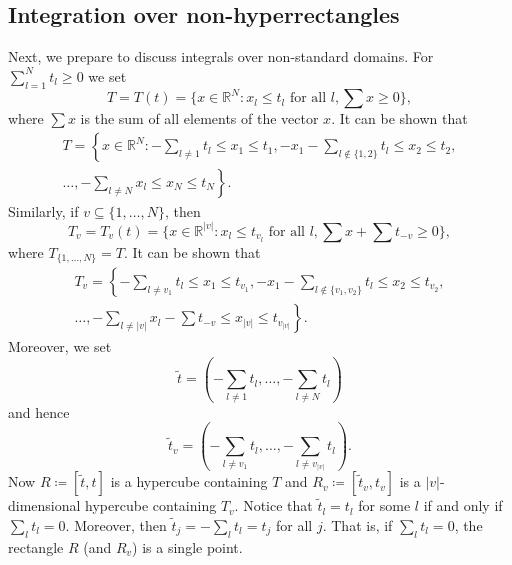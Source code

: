 \documentclass[english, a4paper, 12pt,reqno]{amsart}
\begin{document}
\subsection{Integration over non-hyperrectangles}
\label{subsec:RS-triangle}
Next, we prepare to discuss integrals over non-standard domains. For $\sum_{l=1}^N t_l \geq 0$ we set 
\begin{equation}
\label{T}
T = T(t) = \{x\in\mathbb{R}^N : x_l \leq t_l\text{ for all } l, \sum x \geq 0\},
\end{equation}
where $\sum x$ is the sum of all elements of the vector $x$.
It can be shown that
\begin{equation*}
\begin{split}
T = \left\{x\in\mathbb{R}^N : -\sum_{l\neq 1}t_l \leq x_1 \leq t_1, -x_1-\sum_{l \notin \{1,2\}} t_l \leq x_2 \leq t_2,\right.\\
\left.\dots, -\sum_{l\neq N}x_l \leq x_N \leq t_N \right\}.
\end{split}
\end{equation*}
Similarly, if $v \subseteq \{1,\dots,N\}$, then
$$T_v = T_v(t)= \{ x\in\mathbb{R}^{|v|} : x_l \leq t_{v_l} \text{ for all } l, \sum x+ \sum t_{-v} \geq 0\},$$
where $T_{\{1,\dots,N\}} = T.$
It can be shown that
\begin{equation}
\label{T_v}
\begin{split}
T_v = \left\{-\sum_{l\neq v_1} t_l \leq x_1 \leq t_{v_1}, -x_1-\sum_{l \notin \{v_1,v_2\}} t_l \leq x_2 \leq t_{v_2},\right. \\
\left. \dots, -\sum_{l\neq |v|}x_l  - \sum t_{-v}\leq x_{|v|}\leq t_{v_{|v|}} \right\}.
\end{split}
\end{equation}
Moreover, we set
$$\tilde{t} = \left( -\sum_{l\neq 1} t_l, \dots, -\sum_{l \neq N}t_l\right)$$
and hence
$$\tilde{t}_v = \left( -\sum_{l\neq v_1} t_l, \dots, -\sum_{l \neq v_{|v|}}t_l\right).$$
Now $ R \coloneqq [\tilde{t},t]$ is a hypercube containing $T$ and $R_v \coloneqq [\tilde{t}_v,t_v]$ is a $|v|$-dimensional hypercube containing $T_v$. Notice that $\tilde{t}_l = t_l$ for some $l$ if and only if $\sum_l t_l = 0$. Moreover, then $\tilde{t}_j = -\sum_l t_l = t_j$ for all $j$. That is, if $\sum_l t_l = 0$, the rectangle $R$ (and $R_v$) is a single point. 
\end{document}
